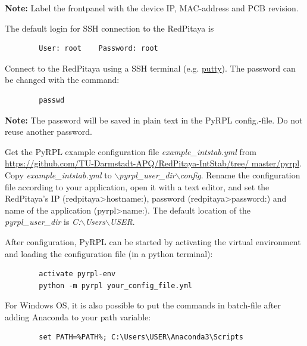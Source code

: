 \documentclass[twoside,a4paper]{refart}
\begin{document}
\textbf{Note:}
Label the frontpanel with the device IP, MAC-address and PCB revision.


 The default login for SSH connection to the RedPitaya is

\begin{tcolorbox}
	\begin{verbatim}
		User: root    Password: root
	\end{verbatim}
\end{tcolorbox}

Connect to the RedPitaya using a SSH terminal (e.g. \href{https://www.putty.org/}{putty}). The password can be changed with the command:
\begin{tcolorbox}
	\begin{verbatim}
		passwd
	\end{verbatim}
\end{tcolorbox}

\textbf{Note: }The password will be saved in plain text in the PyRPL config.-file. Do not reuse another password.

Get the PyRPL example configuration file \textit{example\_intstab.yml} from \href{https://github.com/TU-Darmstadt-APQ/RedPitaya-IntStab/tree/master/pyrpl}{https://github.com/TU-Darmstadt-APQ/RedPitaya-IntStab/tree/ master/pyrpl}. Copy \textit{example\_intstab.yml} to \textit{$\backslash$pyrpl\_user\_dir$\backslash$config}. Rename the configuration file according to your application, open it with a text editor, and set the RedPitaya's IP (redpitaya>hostname:), password  (redpitaya>password:) and name of the application (pyrpl>name:). The default location of the \textit{pyrpl\_user\_dir} is \textit{C:$\backslash$Users$\backslash$USER}.

After configuration, PyRPL can be started by activating the virtual environment and loading the configuration file (in a python terminal):

\begin{tcolorbox}
	\begin{verbatim}
		activate pyrpl-env
		python -m pyrpl your_config_file.yml
	\end{verbatim}
\end{tcolorbox}

For Windows OS, it is also possible to put the commands in batch-file after adding Anaconda to your path variable:

\begin{tcolorbox}
	\begin{verbatim}
		set PATH=%PATH%; C:\Users\USER\Anaconda3\Scripts
	\end{verbatim}
\end{tcolorbox}
\end{document}
